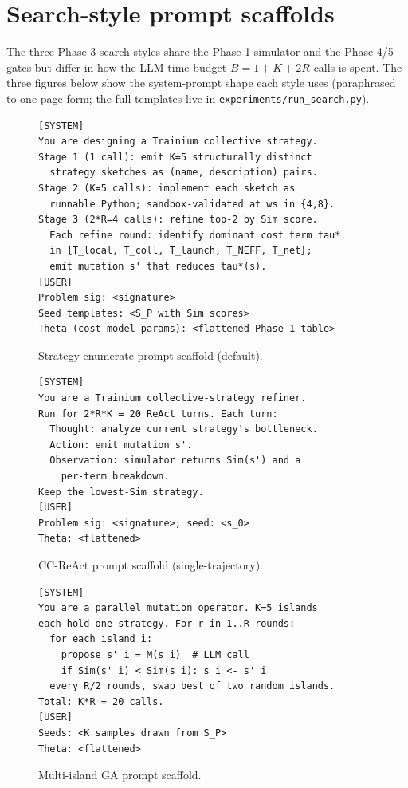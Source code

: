 \section{Search-style prompt scaffolds}
\label{sec:search-prompts}

The three Phase-3 search styles share the Phase-1 simulator and
the Phase-4/5 gates but differ in how the LLM-time budget
$B = 1 + K + 2R$ calls is spent. The three figures below show the
system-prompt shape each style uses (paraphrased to one-page form;
the full templates live in \texttt{experiments/run\_search.py}).

\begin{figure}[!htbp]
\centering
\begin{BVerbatim}[fontsize=\footnotesize]
[SYSTEM]
You are designing a Trainium collective strategy.
Stage 1 (1 call): emit K=5 structurally distinct
  strategy sketches as (name, description) pairs.
Stage 2 (K=5 calls): implement each sketch as
  runnable Python; sandbox-validated at ws in {4,8}.
Stage 3 (2*R=4 calls): refine top-2 by Sim score.
  Each refine round: identify dominant cost term tau*
  in {T_local, T_coll, T_launch, T_NEFF, T_net};
  emit mutation s' that reduces tau*(s).
[USER]
Problem sig: <signature>
Seed templates: <S_P with Sim scores>
Theta (cost-model params): <flattened Phase-1 table>
\end{BVerbatim}
\caption{Strategy-enumerate prompt scaffold (default).}
\label{fig:prompt-strat}
\end{figure}

\begin{figure}[!htbp]
\centering
\begin{BVerbatim}[fontsize=\footnotesize]
[SYSTEM]
You are a Trainium collective-strategy refiner.
Run for 2*R*K = 20 ReAct turns. Each turn:
  Thought: analyze current strategy's bottleneck.
  Action: emit mutation s'.
  Observation: simulator returns Sim(s') and a
    per-term breakdown.
Keep the lowest-Sim strategy.
[USER]
Problem sig: <signature>; seed: <s_0>
Theta: <flattened>
\end{BVerbatim}
\caption{CC-ReAct prompt scaffold (single-trajectory).}
\label{fig:prompt-ccreact}
\end{figure}

\begin{figure}[!htbp]
\centering
\begin{BVerbatim}[fontsize=\footnotesize]
[SYSTEM]
You are a parallel mutation operator. K=5 islands
each hold one strategy. For r in 1..R rounds:
  for each island i:
    propose s'_i = M(s_i)  # LLM call
    if Sim(s'_i) < Sim(s_i): s_i <- s'_i
  every R/2 rounds, swap best of two random islands.
Total: K*R = 20 calls.
[USER]
Seeds: <K samples drawn from S_P>
Theta: <flattened>
\end{BVerbatim}
\caption{Multi-island GA prompt scaffold.}
\label{fig:prompt-mi}
\end{figure}

